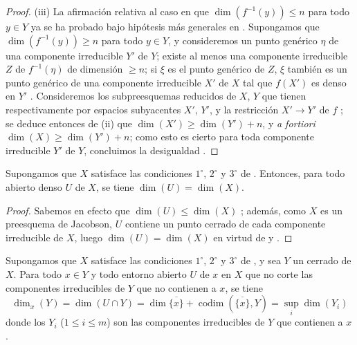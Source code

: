 \begin{proof}
(iii) La afirmación relativa al caso en que $\dim(f^{-1}(y))\leq n$ para todo $y\in Y$ ya se ha probado bajo hipótesis más generales en .
Supongamos que $\dim(f^{-1}(y))\geq n$ para todo $y\in Y$, y consideremos un punto genérico $\eta$ de una componente irreducible $Y'$ de $Y$; existe al menos una componente irreducible $Z$ de $f^{-1}(\eta)$ de dimensión $\geq n$; si $\xi$ es el punto genérico de $Z$, $\xi$ también es un punto genérico de una componente irreducible $X'$ de $X$ tal que $f(X')$ es denso en $Y'$ .
Consideremos los subpreesquemas reducidos de $X$, $Y$ que tienen respectivamente por espacios subyacentes $X'$, $Y'$, y la restricción $X'\to Y'$ de $f$ ; se deduce entonces de (ii) que $\dim(X')\geq\dim(Y')+n$, y \emph{a fortiori} $\dim(X)\geq\dim(Y')+n$; como esto es cierto para toda componente irreducible $Y'$ de $Y$, concluimos la desigualdad .
\end{proof}

\begin{corollary}[10.6.2]
\label{IV.10.6.2}
Supongamos que $X$ satisface las condiciones $1^\circ$, $2^\circ$ y $3^\circ$ de .
Entonces, para todo abierto denso $U$ de $X$, se tiene $\dim(U)=\dim(X)$.
\end{corollary}

\begin{proof}
Sabemos en efecto que $\dim(U)\leq\dim(X)$ ; además, como $X$ es un preesquema de Jacobson, $U$ contiene un punto cerrado de cada componente irreducible de $X$, luego $\dim(U)=\dim(X)$ en virtud de  y .
\end{proof}

\begin{proposition}[10.6.3]
\label{IV.10.6.3}
Supongamos que $X$ satisface las condiciones $1^\circ$, $2^\circ$ y $3^\circ$ de , y sea $Y$ un cerrado de $X$.
Para todo $x\in Y$ y todo entorno abierto $U$ de $x$ en $X$ que no corte las componentes irreducibles de $Y$ que no contienen a $x$, se tiene
\begin{equation}
\label{IV.10.6.3.1}
\tag{10.6.3.1}
\dim_x(Y)=\dim(U\cap Y)=\dim\overline{\{x\}}+\operatorname{codim}(\overline{\{x\}},Y)=\sup_i\dim(Y_i)
\end{equation}
donde los $Y_i$ \textup{(}$1\leq i\leq m$\textup{)} son las componentes irreducibles de $Y$ que contienen a $x$.
\end{proposition}

